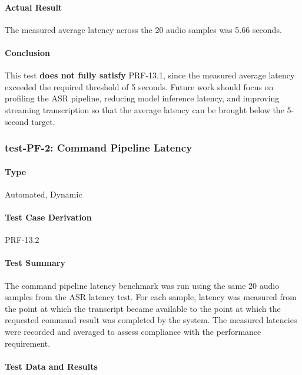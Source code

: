 \documentclass[12pt, titlepage]{article}
\begin{document}
\paragraph{Actual Result}
The measured average latency across the 20 audio samples was 5.66 seconds.

\paragraph{Conclusion}
This test \textbf{does not fully satisfy} PRF-13.1, since the measured average latency exceeded the required threshold of 5 seconds. Future work should focus on profiling the ASR pipeline, reducing model inference latency, and improving streaming transcription so that the average latency can be brought below the 5-second target.

\subsubsection{test-PF-2: Command Pipeline Latency}

\paragraph{Type}
Automated, Dynamic

\paragraph{Test Case Derivation}
PRF-13.2

\paragraph{Test Summary}
The command pipeline latency benchmark was run using the same 20 audio samples from the ASR latency test. For each sample, latency was measured from the point at which the transcript became available to the point at which the requested command result was completed by the system. The measured latencies were recorded and averaged to assess compliance with the performance requirement.

\paragraph{Test Data and Results}
\end{document}

